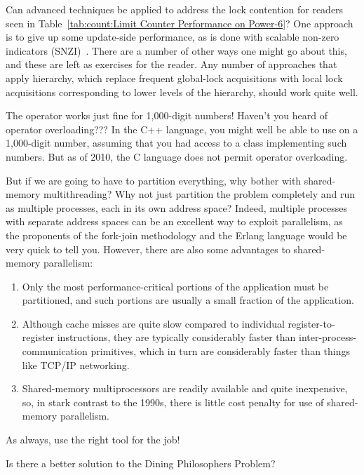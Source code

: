 \QuickQ{}
	Can advanced techniques be applied to address the lock
	contention for readers seen in
	Table~\ref{tab:count:Limit Counter Performance on Power-6}?
\QuickA{}
	One approach is to give up some update-side performance, as is
	done with scalable non-zero indicators
	(SNZI)~\cite{FaithEllen:2007:SNZI}.
	There are a number of other ways one might go about this, and these
	are left as exercises for the reader.
	Any number of approaches that apply hierarchy, which replace
	frequent global-lock acquisitions with local lock acquisitions
	corresponding to lower levels of the hierarchy, should work quite well.

\QuickQ{}
	The \co{++} operator works just fine for 1,000-digit numbers!
	Haven't you heard of operator overloading???
\QuickA{}
	In the C++ language, you might well be able to use \co{++}
	on a 1,000-digit number, assuming that you had access to a
	class implementing such numbers.
	But as of 2010, the C language does not permit operator overloading.

\QuickQ{}
	But if we are going to have to partition everything, why bother
	with shared-memory multithreading?
	Why not just partition the problem completely and run as
	multiple processes, each in its own address space?
\QuickA{}
	Indeed, multiple processes with separate address spaces can be
	an excellent way to exploit parallelism, as the proponents of
	the fork-join methodology and the Erlang language would be very
	quick to tell you.
	However, there are also some advantages to shared-memory parallelism:
	\begin{enumerate}
	\item	Only the most performance-critical portions of the
		application must be partitioned, and such portions
		are usually a small fraction of the application.
	\item	Although cache misses are quite slow compared to
		individual register-to-register instructions,
		they are typically considerably faster than
		inter-process-communication primitives, which in
		turn are considerably faster than things like
		TCP/IP networking.
	\item	Shared-memory multiprocessors are readily available
		and quite inexpensive, so, in stark contrast to the
		1990s, there is little cost penalty for use of
		shared-memory parallelism.
	\end{enumerate}
	As always, use the right tool for the job!

\QuickQ{}
	Is there a better solution to the Dining
	Philosophers Problem?
\QuickA{}

